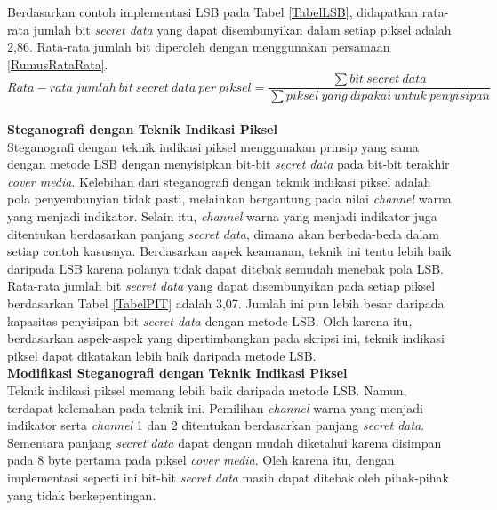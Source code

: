 \documentclass[a4paper,twoside]{article}
\begin{document}
\begin{enumerate}
		Berdasarkan contoh implementasi LSB pada Tabel \ref{TabelLSB}, didapatkan rata-rata jumlah bit \textit{secret data} yang dapat disembunyikan dalam setiap piksel adalah 2,86. Rata-rata jumlah bit diperoleh dengan menggunakan persamaan \ref{RumusRataRata}.\\
		
		\begin{equation}
		 Rata-rata \ jumlah \ bit \ secret \ data \ per \ piksel = \frac{\sum bit \ secret \ data}{\sum piksel \ yang \ dipakai \ untuk \ penyisipan}
		\label{RumusRataRata}
		\end{equation}\\
		
		\textbf{Steganografi dengan Teknik Indikasi Piksel}\\
		Steganografi dengan teknik indikasi piksel menggunakan prinsip yang sama dengan metode LSB dengan menyisipkan bit-bit \textit{secret data} pada bit-bit terakhir \textit{cover media}. Kelebihan dari steganografi dengan teknik indikasi piksel adalah pola penyembunyian tidak pasti, melainkan bergantung pada nilai \textit{channel} warna yang menjadi indikator. Selain itu, \textit{channel} warna yang menjadi indikator juga ditentukan berdasarkan panjang \textit{secret data}, dimana akan berbeda-beda dalam setiap contoh kasusnya. Berdasarkan aspek keamanan, teknik ini tentu lebih baik daripada LSB karena polanya tidak dapat ditebak semudah menebak pola LSB.\\
		
		Rata-rata jumlah bit \textit{secret data} yang dapat disembunyikan pada setiap piksel berdasarkan Tabel \ref{TabelPIT} adalah 3,07. Jumlah ini pun lebih besar daripada kapasitas penyisipan bit \textit{secret data} dengan metode LSB. Oleh karena itu, berdasarkan aspek-aspek yang dipertimbangkan pada skripsi ini, teknik indikasi piksel dapat dikatakan lebih baik daripada metode LSB.\\
		
		\textbf{Modifikasi Steganografi dengan Teknik Indikasi Piksel}\\
		Teknik indikasi piksel memang lebih baik daripada metode LSB. Namun, terdapat kelemahan pada teknik ini. Pemilihan \textit{channel} warna yang menjadi indikator serta \textit{channel} 1 dan 2 ditentukan berdasarkan panjang \textit{secret data}. Sementara panjang \textit{secret data} dapat dengan mudah diketahui karena disimpan pada 8 byte pertama pada piksel \textit{cover media}. Oleh karena itu, dengan implementasi seperti ini bit-bit \textit{secret data} masih dapat ditebak oleh pihak-pihak yang tidak berkepentingan.\\
				

\end{enumerate}
\end{document}
